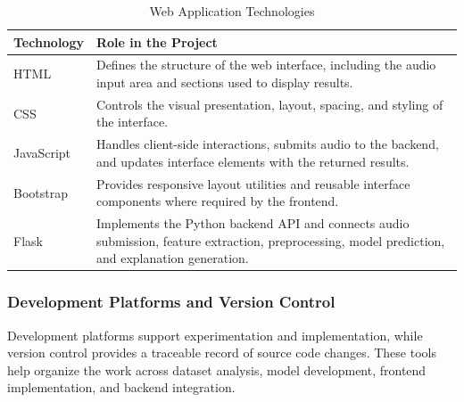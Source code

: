 \documentclass[12pt,a4paper]{report}
\begin{document}
\begin{table}[H]
\centering
\small
\renewcommand{\arraystretch}{1.35}

\begin{tabularx}{\textwidth}{
    >{\raggedright\arraybackslash}p{}
    >{\raggedright\arraybackslash}X
}
\toprule
\textbf{Technology} & \textbf{Role in the Project} \\
\midrule

HTML &
Defines the structure of the web interface, including the audio input area and sections used to display results. \\

CSS &
Controls the visual presentation, layout, spacing, and styling of the interface. \\

JavaScript &
Handles client-side interactions, submits audio to the backend, and updates interface elements with the returned results. \\

Bootstrap &
Provides responsive layout utilities and reusable interface components where required by the frontend. \\

Flask &
Implements the Python backend API and connects audio submission, feature extraction, preprocessing, model prediction, and explanation generation. \\

\bottomrule
\end{tabularx}

\caption{Web Application Technologies}
\label{tab:web-environment}
\end{table}



\subsubsection{Development Platforms and Version Control}

Development platforms support experimentation and implementation, while version control provides a traceable record of source code changes. These tools help organize the work across dataset analysis, model development, frontend implementation, and backend integration.
\end{document}
